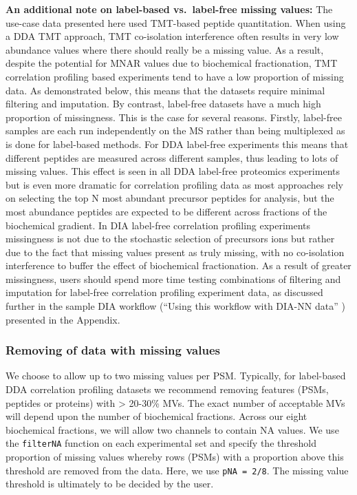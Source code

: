 \documentclass[9pt,a4paper,]{extarticle}
\begin{document}
\textbf{An additional note on label-based vs.~label-free missing values:}
The use-case data presented here used TMT-based peptide quantitation. When using
a DDA TMT approach, TMT co-isolation interference often results in very low
abundance values where there should really be a missing value. As a result,
despite the potential for MNAR values due to biochemical fractionation, TMT
correlation profiling based experiments tend to have a low proportion of missing
data. As demonstrated below, this means that the datasets require minimal filtering
and imputation. By contrast, label-free datasets have a much high proportion of
missingness. This is the case for several reasons. Firstly, label-free samples
are each run independently on the MS rather than being multiplexed as is done
for label-based methods. For DDA label-free experiments this means that different
peptides are measured across different samples, thus leading to lots of missing
values. This effect is seen in all DDA label-free proteomics experiments but is
even more dramatic for correlation profiling data as most approaches rely on
selecting the top N most abundant precursor peptides for analysis, but the most
abundance peptides are expected to be different across fractions of the biochemical
gradient. In DIA label-free correlation profiling experiments missingness is not
due to the stochastic selection of precursors ions but rather due to the fact that
missing values present as truly missing, with no co-isolation interference to
buffer the effect of biochemical fractionation. As a result of greater missingness,
users should spend more time testing combinations of filtering and imputation for
label-free correlation profiling experiment data, as discussed further in the
sample DIA workflow (``Using this workflow with DIA-NN data'' ) presented in the
Appendix.

\subsubsection{Removing of data with missing values}\label{removing-of-data-with-missing-values}

We choose to allow up to two missing values per PSM. Typically, for label-based
DDA correlation profiling datasets we recommend removing features (PSMs, peptides
or proteins) with \textgreater{} 20-30\% MVs. The exact number of acceptable MVs will depend
upon the number of biochemical fractions. Across our eight biochemical fractions,
we will allow two channels to contain NA values. We use the \texttt{filterNA} function
on each experimental set and specify the threshold proportion of missing values
whereby rows (PSMs) with a proportion above this threshold are removed from the
data. Here, we use \texttt{pNA\ =\ 2/8}. The missing value threshold is ultimately to be
decided by the user.
\end{document}
